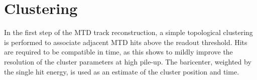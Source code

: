 


\section{Clustering}

In the first step of the MTD track reconstruction, a simple topological clustering is performed to associate adjacent MTD hits above the readout threshold. 
Hits are required to be compatible in time, as this shows to mildly improve the resolution of the cluster parameters at high pile-up. The baricenter, weighted by the single hit energy, is used as an estimate of the cluster position and time. 

